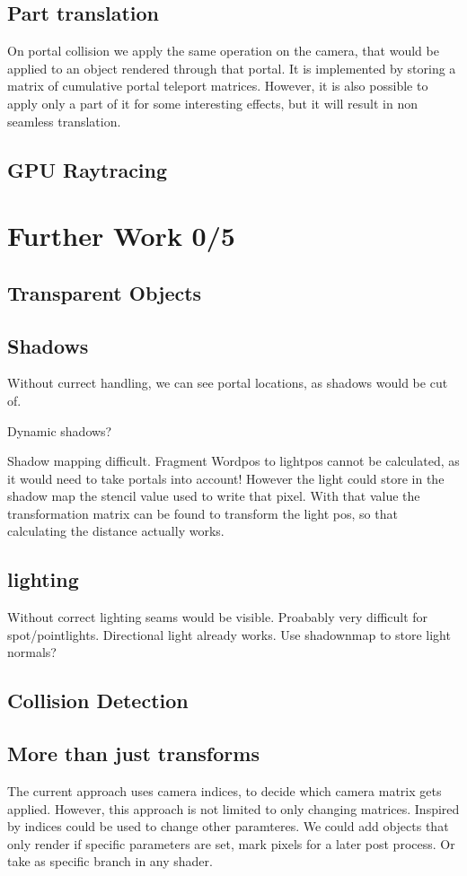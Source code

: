 \subsection{Part translation}


On portal collision we apply the same operation on the camera, that would be applied to an object rendered through that portal.
It is implemented by storing a matrix of cumulative portal teleport matrices.
However, it is also possible to apply only a part of it for some interesting effects, but it will result in non seamless translation.

\subsection{GPU Raytracing}

\section{Further Work 0/5}
\subsection{Transparent Objects}
\subsection{Shadows}
Without currect handling, we can see portal locations, as shadows would be cut of.

Dynamic shadows? 

Shadow mapping difficult. Fragment Wordpos to lightpos cannot be calculated, as it would need to take portals into account!
However the light could store in the shadow map the stencil value used to write that pixel. With that value the transformation matrix can be found to transform the light pos, so that calculating the distance actually works.

\subsection{lighting}
Without correct lighting seams would be visible. Proabably very difficult for spot/pointlights. Directional light already works. Use shadownmap to store light normals?
\subsection{Collision Detection}

\subsection{More than just transforms}
\label{more than transforms}
The current approach uses camera indices, to decide which camera matrix gets applied. However, this approach is not limited to only changing matrices. Inspired by \cite{borst:2009:real} indices could be used to change other paramteres. We could add objects that only render if specific parameters are set, mark pixels for a later post process. Or take as specific branch in any shader.

